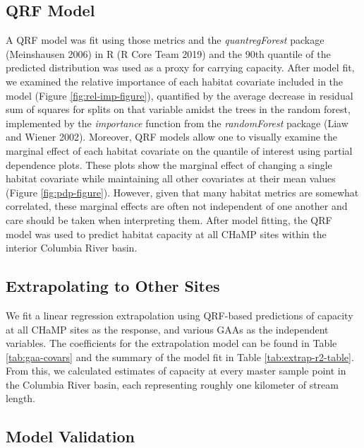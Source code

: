 \documentclass[
  12pt,
]{article}
\begin{document}
\hypertarget{qrf-model}{%
\subsection{QRF Model}\label{qrf-model}}

A QRF model was fit using those metrics and the \emph{quantregForest} package (Meinshausen 2006) in R (R Core Team 2019) and the 90th quantile of the predicted distribution was used as a proxy for carrying capacity. After model fit, we examined the relative importance of each habitat covariate included in the model (Figure \ref{fig:rel-imp-figure}), quantified by the average decrease in residual sum of squares for splits on that variable amidst the trees in the random forest, implemented by the \emph{importance} function from the \emph{randomForest} package (Liaw and Wiener 2002). Moreover, QRF models allow one to visually examine the marginal effect of each habitat covariate on the quantile of interest using partial dependence plots. These plots show the marginal effect of changing a single habitat covariate while maintaining all other covariates at their mean values (Figure \ref{fig:pdp-figure}). However, given that many habitat metrics are somewhat correlated, these marginal effects are often not independent of one another and care should be taken when interpreting them. After model fitting, the QRF model was used to predict habitat capacity at all CHaMP sites within the interior Columbia River basin.

\hypertarget{extrapolating-to-other-sites-1}{%
\subsection{Extrapolating to Other Sites}\label{extrapolating-to-other-sites-1}}

We fit a linear regression extrapolation using QRF-based predictions of capacity at all CHaMP sites as the response, and various GAAs as the independent variables. The coefficients for the extrapolation model can be found in Table \ref{tab:gaa-covars} and the summary of the model fit in Table \ref{tab:extrap-r2-table}. From this, we calculated estimates of capacity at every master sample point in the Columbia River basin, each representing roughly one kilometer of stream length.

\hypertarget{model-validation-1}{%
\subsection{Model Validation}\label{model-validation-1}}
\end{document}
